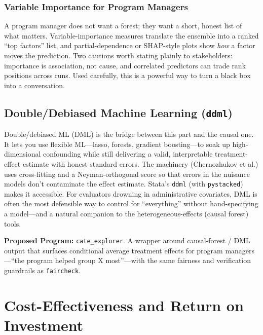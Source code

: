 \documentclass[
    a4paper,
    fontsize=10pt,
    twoside=true,
    numbers=noenddot,
]{kaobook}
\begin{document}
\subsection{Variable Importance for Program Managers}
A program manager does not want a forest; they want a short, honest list of what matters. Variable-importance measures translate the ensemble into a ranked \enquote{top factors} list, and partial-dependence or SHAP-style plots show \emph{how} a factor moves the prediction. Two cautions worth stating plainly to stakeholders: importance is association, not cause, and correlated predictors can trade rank positions across runs. Used carefully, this is a powerful way to turn a black box into a conversation.

\section{Double/Debiased Machine Learning (\texttt{ddml})}
Double/debiased ML (DML) is the bridge between this part and the causal one. It lets you use flexible ML---lasso, forests, gradient boosting---to soak up high-dimensional confounding while still delivering a valid, interpretable treatment-effect estimate with honest standard errors. The machinery (Chernozhukov et al.) uses cross-fitting and a Neyman-orthogonal score so that errors in the nuisance models don't contaminate the effect estimate. Stata's \texttt{ddml} (with \texttt{pystacked}) makes it accessible. For evaluators drowning in administrative covariates, DML is often the most defensible way to control for \enquote{everything} without hand-specifying a model---and a natural companion to the heterogeneous-effects (causal forest) tools.

\begin{kaobox}[frametitle=Ado-file Idea: \texttt{cate\_explorer}]
\textbf{Proposed Program:} \texttt{cate\_explorer}. A wrapper around causal-forest / DML output that surfaces conditional average treatment effects for program managers---\enquote{the program helped group X most}---with the same fairness and verification guardrails as \texttt{faircheck}.
\end{kaobox}

\chapter{Cost-Effectiveness and Return on Investment}
\end{document}

